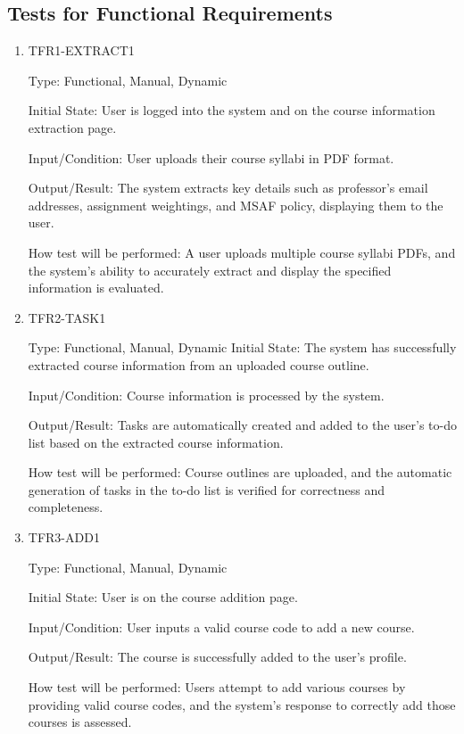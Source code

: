 \documentclass[12pt, titlepage]{article}
\begin{document}
\subsection{Tests for Functional Requirements}

\begin{enumerate}
\item{TFR1-EXTRACT1\\}\label{TFR1-EXTRACT1}

Type: Functional, Manual, Dynamic

Initial State: User is logged into the system and on the course information extraction page.

Input/Condition: User uploads their course syllabi in PDF format.

Output/Result: The system extracts key details such as professor's email addresses, assignment weightings, and MSAF policy, displaying them to the user.

How test will be performed: A user uploads multiple course syllabi PDFs, and the system's ability to accurately extract and display the specified information is evaluated.

\item{TFR2-TASK1\\}\label{TFR2-TASK1}

Type: Functional, Manual, Dynamic
Initial State: The system has successfully extracted course information from an uploaded course outline.

Input/Condition: Course information is processed by the system.

Output/Result: Tasks are automatically created and added to the user's to-do list based on the extracted course information.

How test will be performed: Course outlines are uploaded, and the automatic generation of tasks in the to-do list is verified for correctness and completeness.

\item{TFR3-ADD1\\}\label{TFR3-ADD1}

Type: Functional, Manual, Dynamic

Initial State: User is on the course addition page.

Input/Condition: User inputs a valid course code to add a new course.

Output/Result: The course is successfully added to the user's profile.

How test will be performed: Users attempt to add various courses by providing valid course codes, and the system's response to correctly add those courses is assessed.


\end{enumerate}
\end{document}
